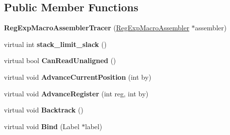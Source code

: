 \subsection*{Public Member Functions}
\begin{DoxyCompactItemize}
\item 
\hypertarget{classv8_1_1internal_1_1_reg_exp_macro_assembler_tracer_a8aa8fe9b029ee960ea5ead57fbb65e14}{}{\bfseries Reg\+Exp\+Macro\+Assembler\+Tracer} (\hyperlink{classv8_1_1internal_1_1_reg_exp_macro_assembler}{Reg\+Exp\+Macro\+Assembler} $\ast$assembler)\label{classv8_1_1internal_1_1_reg_exp_macro_assembler_tracer_a8aa8fe9b029ee960ea5ead57fbb65e14}

\item 
\hypertarget{classv8_1_1internal_1_1_reg_exp_macro_assembler_tracer_a4f68f899c4c4e9a8f5c4bbb12d33dddb}{}virtual int {\bfseries stack\+\_\+limit\+\_\+slack} ()\label{classv8_1_1internal_1_1_reg_exp_macro_assembler_tracer_a4f68f899c4c4e9a8f5c4bbb12d33dddb}

\item 
\hypertarget{classv8_1_1internal_1_1_reg_exp_macro_assembler_tracer_ad6b17a789c51283469c82eefec821b7f}{}virtual bool {\bfseries Can\+Read\+Unaligned} ()\label{classv8_1_1internal_1_1_reg_exp_macro_assembler_tracer_ad6b17a789c51283469c82eefec821b7f}

\item 
\hypertarget{classv8_1_1internal_1_1_reg_exp_macro_assembler_tracer_a5313f22d15c95a101780bb7a47e98611}{}virtual void {\bfseries Advance\+Current\+Position} (int by)\label{classv8_1_1internal_1_1_reg_exp_macro_assembler_tracer_a5313f22d15c95a101780bb7a47e98611}

\item 
\hypertarget{classv8_1_1internal_1_1_reg_exp_macro_assembler_tracer_a70362adbf72adba283482916fbc43203}{}virtual void {\bfseries Advance\+Register} (int reg, int by)\label{classv8_1_1internal_1_1_reg_exp_macro_assembler_tracer_a70362adbf72adba283482916fbc43203}

\item 
\hypertarget{classv8_1_1internal_1_1_reg_exp_macro_assembler_tracer_a810bfb389dc17649b5bd44695b9d3c1f}{}virtual void {\bfseries Backtrack} ()\label{classv8_1_1internal_1_1_reg_exp_macro_assembler_tracer_a810bfb389dc17649b5bd44695b9d3c1f}

\item 
\hypertarget{classv8_1_1internal_1_1_reg_exp_macro_assembler_tracer_a821121162f9db6acc863097e0a9e0b1d}{}virtual void {\bfseries Bind} (Label $\ast$label)\label{classv8_1_1internal_1_1_reg_exp_macro_assembler_tracer_a821121162f9db6acc863097e0a9e0b1d}


\end{DoxyCompactItemize}

